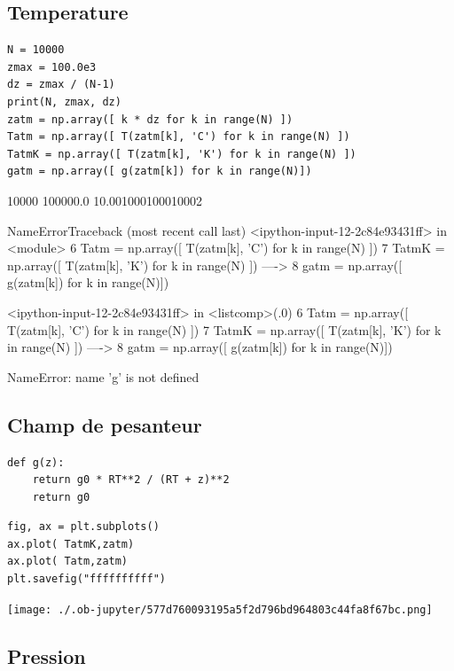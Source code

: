 \documentclass[11pt]{article}
\begin{document}
\subsection{Temperature}
\label{sec:org518a230}

\begin{verbatim}
N = 10000
zmax = 100.0e3
dz = zmax / (N-1)
print(N, zmax, dz)
zatm = np.array([ k * dz for k in range(N) ])
Tatm = np.array([ T(zatm[k], 'C') for k in range(N) ])
TatmK = np.array([ T(zatm[k], 'K') for k in range(N) ])
gatm = np.array([ g(zatm[k]) for k in range(N)])
\end{verbatim}

10000 100000.0 10.001000100010002

NameErrorTraceback (most recent call last)
<ipython-input-12-2c84e93431ff> in <module>
      6 Tatm = np.array([ T(zatm[k], 'C') for k in range(N) ])
      7 TatmK = np.array([ T(zatm[k], 'K') for k in range(N) ])
----> 8 gatm = np.array([ g(zatm[k]) for k in range(N)])

<ipython-input-12-2c84e93431ff> in <listcomp>(.0)
      6 Tatm = np.array([ T(zatm[k], 'C') for k in range(N) ])
      7 TatmK = np.array([ T(zatm[k], 'K') for k in range(N) ])
----> 8 gatm = np.array([ g(zatm[k]) for k in range(N)])

NameError: name 'g' is not defined


\subsection{Champ de pesanteur}
\label{sec:org9bad920}

\begin{verbatim}
def g(z):
    return g0 * RT**2 / (RT + z)**2
    return g0
\end{verbatim}

\begin{verbatim}
fig, ax = plt.subplots()
ax.plot( TatmK,zatm)
ax.plot( Tatm,zatm)
plt.savefig("ffffffffff")
\end{verbatim}

\begin{center}
\texttt{[image: ./.ob-jupyter/577d760093195a5f2d796bd964803c44fa8f67bc.png]}
\end{center}


\subsection{Pression}
\label{sec:org0caf8b5}
\end{document}
